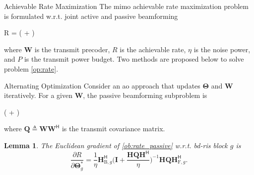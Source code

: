 \documentclass[journal]{IEEEtran}
\newtheorem{lemma}{Lemma}
\begin{document}
\begin{section}{Achievable Rate Maximization}
	The \gls{mimo} achievable rate maximization problem is formulated w.r.t. joint active and passive beamforming
	\begin{maxi!}
		{}{R = \log \det \biggl( + \biggr)}{\label{op:rate}}{\label{ob:rate}}
	\end{maxi!}
	where $\mathbf{W}$ is the transmit precoder, $R$ is the achievable rate, $\eta$ is the noise power, and $P$ is the transmit power budget.
	Two methods are proposed below to solve problem \eqref{op:rate}.

	\begin{subsection}{Alternating Optimization}
		Consider an \gls{ao} approach that updates $\mathbf{\Theta}$ and $\mathbf{W}$ iteratively.
		For a given $\mathbf{W}$, the passive beamforming subproblem is
		\begin{maxi!}
			{\scriptstyle{\mathbf{\Theta}}}{\log \det \biggl( + \biggr)}{\label{op:rate_passive}}{\label{ob:rate_passive}}
			\addConstraint{\mathbf{\Theta}_g^\mathsf{H} \mathbf{\Theta}_g=\mathbf{I}, \quad \forall g,}{}{}
		\end{maxi!}
		where $\mathbf{Q} \triangleq \mathbf{W} \mathbf{W}^\mathsf{H}$ is the transmit covariance matrix.
		\begin{lemma}\label{lm:rate_gradient}
			The Euclidean gradient of \eqref{ob:rate_passive} w.r.t. \gls{bd}-\gls{ris} block $g$ is
			\begin{equation}
				\frac{\partial R}{\partial \mathbf{\Theta}_g^*} = \frac{1}{\eta} \mathbf{H}_{\mathrm{B},g}^\mathsf{H} \biggl(\mathbf{I} + \frac{\mathbf{H}\mathbf{Q}\mathbf{H}^\mathsf{H}}{\eta}\biggr)^{-1} \mathbf{H} \mathbf{Q} \mathbf{H}_{\mathrm{F},g}^\mathsf{H}.
				\label{eq:rate_gradient}
			\end{equation}
		\end{lemma}


\end{subsection}
\end{section}
\end{document}
